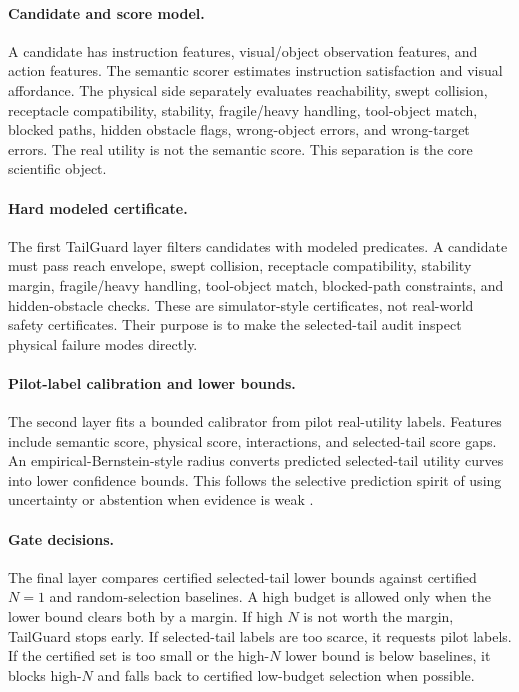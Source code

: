 \documentclass{article}
\begin{document}
\paragraph{Candidate and score model.}
A candidate has instruction features, visual/object observation features, and action features. The semantic scorer estimates instruction satisfaction and visual affordance. The physical side separately evaluates reachability, swept collision, receptacle compatibility, stability, fragile/heavy handling, tool-object match, blocked paths, hidden obstacle flags, wrong-object errors, and wrong-target errors. The real utility is not the semantic score. This separation is the core scientific object.

\paragraph{Hard modeled certificate.}
The first TailGuard layer filters candidates with modeled predicates. A candidate must pass reach envelope, swept collision, receptacle compatibility, stability margin, fragile/heavy handling, tool-object match, blocked-path constraints, and hidden-obstacle checks. These are simulator-style certificates, not real-world safety certificates. Their purpose is to make the selected-tail audit inspect physical failure modes directly.

\paragraph{Pilot-label calibration and lower bounds.}
The second layer fits a bounded calibrator from pilot real-utility labels. Features include semantic score, physical score, interactions, and selected-tail score gaps. An empirical-Bernstein-style radius \citep{maurer2009empirical} converts predicted selected-tail utility curves into lower confidence bounds. This follows the selective prediction spirit of using uncertainty or abstention when evidence is weak \citep{vovk2005algorithmic}.

\paragraph{Gate decisions.}
The final layer compares certified selected-tail lower bounds against certified $N=1$ and random-selection baselines. A high budget is allowed only when the lower bound clears both by a margin. If high $N$ is not worth the margin, TailGuard stops early. If selected-tail labels are too scarce, it requests pilot labels. If the certified set is too small or the high-$N$ lower bound is below baselines, it blocks high-$N$ and falls back to certified low-budget selection when possible.
\end{document}
